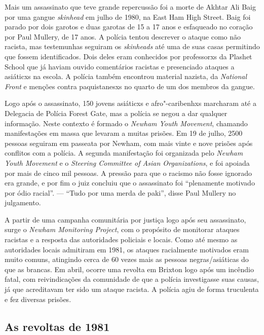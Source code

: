 Mais um assassinato que teve grande repercussão foi a morte de Akhtar Ali Baig por uma gangue \emph{skinhead} em julho de 1980, na East Ham High Street. Baig foi parado por dois garotos e duas garotas de 15 a 17 anos e esfaqueado no coração por Paul Mullery, de 17 anos. A polícia tentou descrever o ataque como não racista, mas testemunhas seguiram os \emph{skinheads} até uma de suas casas permitindo que fossem identificados. Dois deles eram conhecidos por professorxs da Plashet School que já haviam ouvido comentários racistas e presenciado ataques a asiáticxs na escola. A polícia também encontrou material nazista, da \emph{National Front} e menções contra paquistanesxs no quarto de um dos membros da gangue.

Logo após o assassinato, 150 jovens asiáticxs e afro"-caribenhxs marcharam até a Delegacia de Polícia Forest Gate, mas a polícia se negou a dar qualquer informação. Neste contexto é formado o \emph{Newham Youth Movement}, chamando manifestações em massa que levaram a muitas prisões. Em 19 de julho, 2500 pessoas seguiram em passeata por Newham, com mais vinte e nove prisões após conflitos com a polícia. A segunda manifestação foi organizada pelo \emph{Newham Youth Movement} e o \emph{Steering Committee of Asian Organizations}, e foi apoiada por mais de cinco mil pessoas. A pressão para que o racismo não fosse ignorado era grande, e por fim o juiz concluiu que o assassinato foi ``plenamente motivado por ódio racial''. --- ``Tudo por uma merda de paki'', disse Paul Mullery no julgamento.

A partir de uma campanha comunitária por justiça logo após seu assassinato, surge o \emph{Newham Monitoring Project}, com o propósito de monitorar ataques racistas e a resposta das autoridades policiais e locais. Como até mesmo as autoridades locais admitiram em 1981, os ataques racialmente motivados eram muito comuns, atingindo cerca de 60 vezes mais as pessoas negras/asiáticas do que as brancas. Em abril, ocorre uma revolta em Brixton logo após um incêndio fatal, com reivindicações da comunidade de que a polícia investigasse suas causas, já que acreditavam ter sido um ataque racista. A polícia agiu de forma truculenta e fez diversas prisões.


\subsection{As revoltas de 1981}

